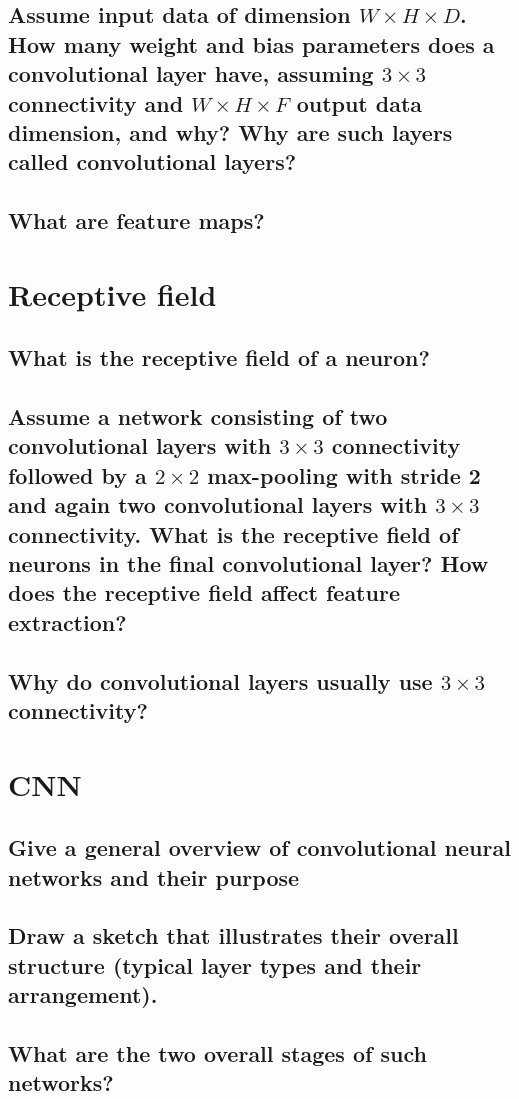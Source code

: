 \subsection{Assume input data of dimension $W \times H \times D$. How many weight and bias parameters does a convolutional layer have, assuming $3 \times 3$ connectivity and $W \times H \times  F$ output data dimension, and why? Why are such layers called convolutional layers?}
\subsection{What are feature maps?}

\section{Receptive field}
\subsection{What is the receptive field of a neuron?}
\subsection{Assume a network consisting of two convolutional layers with $3 \times 3$ connectivity followed by a $2 \times 2$ max-pooling with stride 2 and again two convolutional layers with $3 \times 3$ connectivity. What is the receptive field of neurons in the final convolutional layer? How does the receptive field affect feature extraction? }
\subsection{Why do convolutional layers usually use $3 \times 3$ connectivity?}


\section{CNN}
\subsection{Give a general overview of convolutional neural networks and their purpose}
\subsection{Draw a sketch that illustrates their overall structure (typical layer types and their arrangement).}
\subsection{What are the two overall stages of such networks?}

